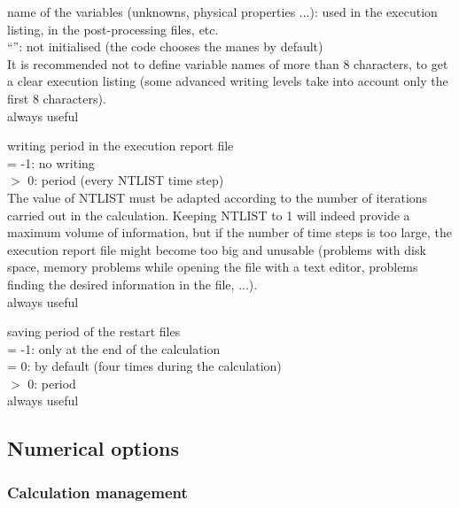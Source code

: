 {name of the variables (unknowns, physical properties ...): used in the
execution listing, in the post-processing files, etc.\\
{``''}: not initialised (the code chooses the manes by default)\\
It is recommended not to define variable names of more than 8
characters, to get a clear execution listing (some advanced writing
levels take into account only the first 8 characters).\\
always useful}

{writing period in the execution report file\\
\hspace*{1.3cm}= -1: no writing\\
\hspace*{1.3cm}$>$ 0: period (every NTLIST time step)\\
The value of NTLIST must be adapted according to the number of iterations
carried out in the calculation. Keeping NTLIST to 1 will indeed provide
a maximum volume of information, but if the number of time steps is too large,
the execution report file might become too big and unusable
(problems with disk space, memory problems while opening the file with a text
editor, problems finding the desired information in the file, ...).\\
always useful}

{saving period of the restart files\\
\hspace*{1.3cm}= -1: only at the end of the calculation\\
\hspace*{1.3cm}= 0: by default (four times during the calculation)\\
\hspace*{1.3cm}$>$ 0: period\\
always useful}


\subsection{Numerical options}
\subsubsection{Calculation management}

